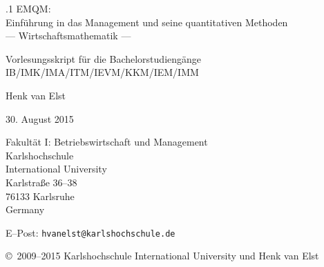 \documentclass[a4paper,12pt]{book}
\begin{document}
\hskip8cm
\begin{minipage}{8cm}
\end{minipage}

\vspace*{2cm}
\begin{center}
{\Huge{}.1 EMQM:\\
                    Einf\"uhrung in das Management und
                    seine quantitativen Methoden\\
                    --- Wirtschaftsmathematik ---
\par}
\par\vfill\vfill
                            Vorlesungsskript f\"ur
                            die Bachelorstudieng\"ange
                            IB/IMK/IMA/ITM/IEVM/KKM/IEM/IMM
\par\vfill\vfill\vfill

                    {\large\sc Henk van Elst}

\par\vfill

                 30. August 2015
\par\vfill\vfill

                 Fakult\"at I: Betriebswirtschaft und Management\\
                 Karlshochschule\\
                 International University\\
                 Karlstra\ss e 36--38\\
                 76133 Karlsruhe\\
                 Germany
\par\vfill
                 E--Post: {\tt hvanelst@karlshochschule.de}
\par\vfill\vfill\vfill
									\copyright\ 2009--2015 Karlshochschule
									International University
									und Henk van Elst
                    
\end{center}
\vspace*{1cm}
\sloppy
      \renewcommand{\thepage}{}                 %
      \newpage \thispagestyle{empty}
      \setcounter{page}{1}
\tableofcontents
      \newpage \thispagestyle{empty}
      \cleardoublepage {}













\end{document}
